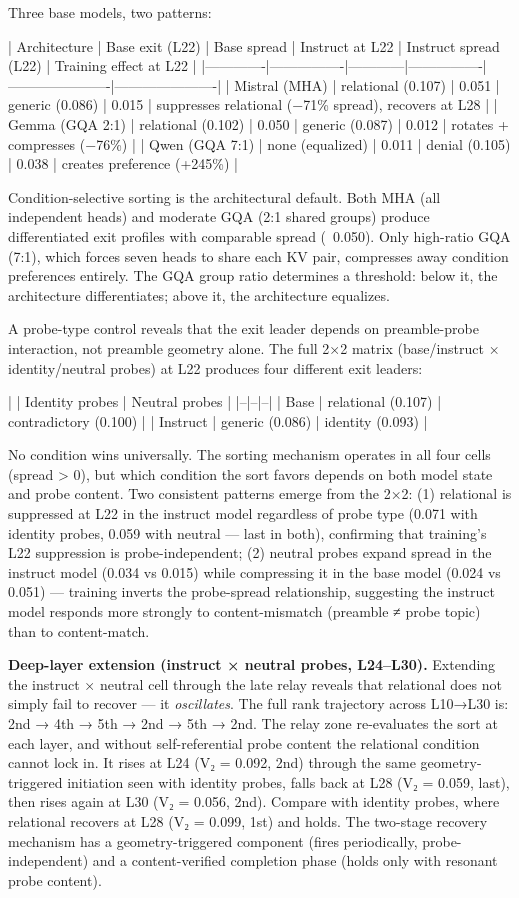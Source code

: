 \documentclass[12pt]{article}
\begin{document}
Three base models, two patterns:

| Architecture | Base exit (L22) | Base spread | Instruct at L22 | Instruct spread (L22) | Training effect at L22 |
|-------------|----------------|------------|----------------|----------------------|----------------------|
| Mistral (MHA) | relational (0.107) | 0.051 | generic (0.086) | 0.015 | suppresses relational (−71\% spread), recovers at L28 |
| Gemma (GQA 2:1) | relational (0.102) | 0.050 | generic (0.087) | 0.012 | rotates + compresses (−76\%) |
| Qwen (GQA 7:1) | none (equalized) | 0.011 | denial (0.105) | 0.038 | creates preference (+245\%) |

Condition-selective sorting is the architectural default. Both MHA (all independent heads) and moderate GQA (2:1 shared groups) produce differentiated exit profiles with comparable spread (~0.050). Only high-ratio GQA (7:1), which forces seven heads to share each KV pair, compresses away condition preferences entirely. The GQA group ratio determines a threshold: below it, the architecture differentiates; above it, the architecture equalizes.

A probe-type control reveals that the exit leader depends on preamble-probe interaction, not preamble geometry alone. The full 2×2 matrix (base/instruct × identity/neutral probes) at L22 produces four different exit leaders:

| | Identity probes | Neutral probes |
|--|--|--|
| Base | relational (0.107) | contradictory (0.100) |
| Instruct | generic (0.086) | identity (0.093) |

No condition wins universally. The sorting mechanism operates in all four cells (spread > 0), but which condition the sort favors depends on both model state and probe content. Two consistent patterns emerge from the 2×2: (1) relational is suppressed at L22 in the instruct model regardless of probe type (0.071 with identity probes, 0.059 with neutral — last in both), confirming that training's L22 suppression is probe-independent; (2) neutral probes expand spread in the instruct model (0.034 vs 0.015) while compressing it in the base model (0.024 vs 0.051) — training inverts the probe-spread relationship, suggesting the instruct model responds more strongly to content-mismatch (preamble ≠ probe topic) than to content-match.

\textbf{Deep-layer extension (instruct × neutral probes, L24–L30).} Extending the instruct × neutral cell through the late relay reveals that relational does not simply fail to recover — it \textit{oscillates}. The full rank trajectory across L10→L30 is: 2nd → 4th → 5th → 2nd → 5th → 2nd. The relay zone re-evaluates the sort at each layer, and without self-referential probe content the relational condition cannot lock in. It rises at L24 (V₂ = 0.092, 2nd) through the same geometry-triggered initiation seen with identity probes, falls back at L28 (V₂ = 0.059, last), then rises again at L30 (V₂ = 0.056, 2nd). Compare with identity probes, where relational recovers at L28 (V₂ = 0.099, 1st) and holds. The two-stage recovery mechanism has a geometry-triggered component (fires periodically, probe-independent) and a content-verified completion phase (holds only with resonant probe content).
\end{document}
